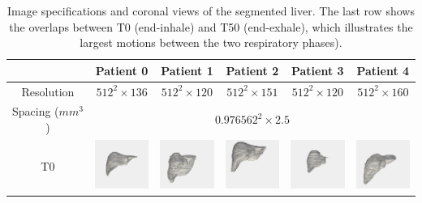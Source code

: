 \documentclass[]{spie}  %
\begin{document}
\begin{table}
\caption{Image specifications and coronal views of the segmented liver. The last row shows the overlaps between T0 (end-inhale) and T50 (end-exhale), which illustrates the largest motions between the two respiratory phases).}
\label{tab:data_specs}
\begin{center}
\begin{tabular}{c|c|c|c|c|c}
\hline
 & Patient 0 & Patient 1 & Patient 2 & Patient 3 & Patient 4 \\
\hline
Resolution & $512^2 \times 136$ & $512^2 \times 120$ & $512^2 \times 151$ & $512^2 \times 120$ & $512^2 \times 160$ \\
\hline
Spacing ($mm^3$) & \multicolumn{5}{c}{$0.976562^2 \times 2.5$} \\
\hline
T0 & \includegraphics[width=0.7in]{seg_p0t0} & \includegraphics[width=0.7in]{seg_p1t0} & \includegraphics[width=0.7in]{seg_p2t0} & \includegraphics[width=0.7in]{seg_p3t20} & \includegraphics[width=0.7in]{seg_p4t0} \\
\hline

\end{tabular}
\end{center}
\end{table}
\end{document}
